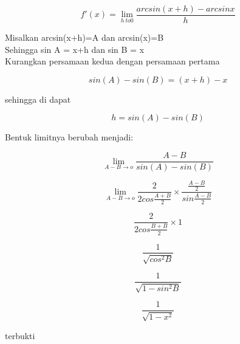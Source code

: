 \documentclass{article}
\begin{document}
\begin{eulernotebook}
\begin{eulercomment}
\begin{eulercomment}
\begin{eulercomment}
\begin{eulercomment}
\begin{eulercomment}
\begin{eulercomment}
\begin{eulercomment}
\end{eulercomment}
\begin{eulerformula}
\[
f'(x)= \lim_{h\ to 0}\frac {arcsin(x+h)-arcsin x}{h}
\]
\end{eulerformula}
\begin{eulercomment}
Misalkan arcsin(x+h)=A dan arcsin(x)=B\\
Sehingga sin A = x+h dan sin B = x\\
Kurangkan persamaan kedua dengan persamaan pertama\\
\end{eulercomment}
\begin{eulerformula}
\[
sin(A)-sin(B)=(x+h)-x
\]
\end{eulerformula}
\begin{eulercomment}
sehingga di dapat\\
\end{eulercomment}
\begin{eulerformula}
\[
h=sin(A)-sin(B)
\]
\end{eulerformula}
\begin{eulercomment}
Bentuk limitnya berubah menjadi:\\
\end{eulercomment}
\begin{eulerformula}
\[
\lim_{A-B\to o} \frac{A-B}{sin(A)-sin(B)}
\]
\end{eulerformula}
\begin{eulerformula}
\[
\lim_{A-B\to o} \frac{2}{2cos\frac{A+B}{2}} \times \frac{\frac{A-B}{2}}{sin\frac{A-B}{2}}
\]
\end{eulerformula}
\begin{eulerformula}
\[
\frac{2}{2cos\frac{B+B}{2}} \times 1
\]
\end{eulerformula}
\begin{eulerformula}
\[
\frac{1}{\sqrt{cos^{2}B}}
\]
\end{eulerformula}
\begin{eulerformula}
\[
\frac{1}{\sqrt{1-sin^{2}B}}
\]
\end{eulerformula}
\begin{eulerformula}
\[
\frac{1}{\sqrt{1-x^{2}}}
\]
\end{eulerformula}
\begin{eulercomment}
terbukti
\end{eulercomment}

\end{eulercomment}
\end{eulercomment}
\end{eulercomment}
\end{eulercomment}
\end{eulercomment}
\end{eulercomment}
\end{eulernotebook}
\end{document}
